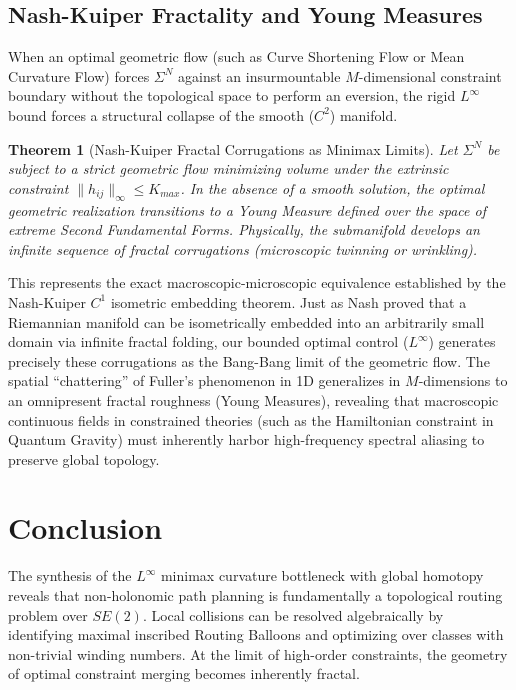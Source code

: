 \documentclass[12pt, a4paper]{article}
\newtheorem{theorem}{Theorem}[section]
\begin{document}
\subsection{Nash-Kuiper Fractality and Young Measures}
When an optimal geometric flow (such as Curve Shortening Flow or Mean Curvature Flow) forces $\Sigma^N$ against an insurmountable $M$-dimensional constraint boundary without the topological space to perform an eversion, the rigid $L^\infty$ bound forces a structural collapse of the smooth ($C^2$) manifold.

\begin{theorem}[Nash-Kuiper Fractal Corrugations as Minimax Limits]
Let $\Sigma^N$ be subject to a strict geometric flow minimizing volume under the extrinsic constraint $\|h_{ij}\|_{\infty} \le K_{max}$. In the absence of a smooth solution, the optimal geometric realization transitions to a Young Measure defined over the space of extreme Second Fundamental Forms. Physically, the submanifold develops an infinite sequence of fractal corrugations (microscopic twinning or wrinkling).
\end{theorem}

This represents the exact macroscopic-microscopic equivalence established by the Nash-Kuiper $C^1$ isometric embedding theorem. Just as Nash proved that a Riemannian manifold can be isometrically embedded into an arbitrarily small domain via infinite fractal folding, our bounded optimal control ($L^\infty$) generates precisely these corrugations as the Bang-Bang limit of the geometric flow. The spatial ``chattering'' of Fuller's phenomenon in 1D generalizes in $M$-dimensions to an omnipresent fractal roughness (Young Measures), revealing that macroscopic continuous fields in constrained theories (such as the Hamiltonian constraint in Quantum Gravity) must inherently harbor high-frequency spectral aliasing to preserve global topology.

\section{Conclusion}
The synthesis of the $L^\infty$ minimax curvature bottleneck with global homotopy reveals that non-holonomic path planning is fundamentally a topological routing problem over $SE(2)$. Local collisions can be resolved algebraically by identifying maximal inscribed Routing Balloons and optimizing over classes with non-trivial winding numbers. At the limit of high-order constraints, the geometry of optimal constraint merging becomes inherently fractal.
\end{document}
